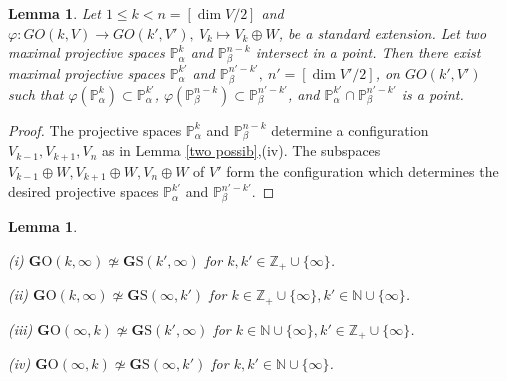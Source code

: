 \documentclass[12pt]{amsart}
\renewcommand{\phi}{\varphi}
\newtheorem{lemma}[theorem]{Lemma}
\theoremstyle{definition}
\begin{document}
\begin{lemma}\label{point, line}
Let $1\le k<n=[\dim V/2]$ and $\phi:GO(k,V)\to GO(k',V'),\ V_k\mapsto V_k\oplus W$, be a standard extension.
Let two maximal projective spaces $\mathbb{P}^k_{\alpha}$ and $\mathbb{P}^{n-k}_{\beta}$ intersect in a point.
Then there exist maximal projective spaces $\mathbb{P}^{k'}_{\alpha}$ and
$\mathbb{P}^{n'-k'}_{\beta},\ n'=[\dim V'/2]$, on
$GO(k',V')$ such that $\phi(\mathbb{P}^k_{\alpha})\subset\mathbb{P}^{k'}_{\alpha}$,
$\phi(\mathbb{P}^{n-k}_{\beta})\subset\mathbb{P}^{n'-k'}_{\beta}$, and
$\mathbb{P}^{k'}_{\alpha}\cap\mathbb{P}^{n'-k'}_{\beta}$ is a point.
\end{lemma}

\begin{proof}
The projective spaces $\mathbb{P}^k_{\alpha}$ and $\mathbb{P}^{n-k}_{\beta}$ determine a configuration
$V_{k-1},V_{k+1},V_n$ as in Lemma \ref{two possib},(iv). The subspaces $V_{k-1}\oplus W,V_{k+1}\oplus W,V_n\oplus W$
of $V'$ form the configuration which determines the desired projective spaces $\mathbb{P}^{k'}_{\alpha}$ and
$\mathbb{P}^{n'-k'}_{\beta}$.
\end{proof}



\begin{lemma}\label{non-isom3}

(i) $\mathbf{G}\mathrm{O}(k,\infty)\not\simeq\mathbf{G}\mathrm{S}(k',\infty)$ for $k,k'\in\mathbb{Z}_{+}\cup\{\infty\}$.

(ii) $\mathbf{G}\mathrm{O}(k,\infty)\not\simeq\mathbf{G}\mathrm{S}(\infty,k')$ for $k\in\mathbb{Z}_{+}\cup\{\infty\},
k'\in\mathbb{N}\cup\{\infty\}$.

(iii) $\mathbf{G}\mathrm{O}(\infty,k)\not\simeq\mathbf{G}\mathrm{S}(k',\infty)$ for
$k\in\mathbb{N}\cup\{\infty\},k'\in\mathbb{Z}_{+}\cup\{\infty\}$.

(iv) $\mathbf{G}\mathrm{O}(\infty,k)\not\simeq\mathbf{G}\mathrm{S}(\infty,k')$ for $k,k'\in\mathbb{N}\cup\{\infty\}$.
\end{lemma}
\end{document}
